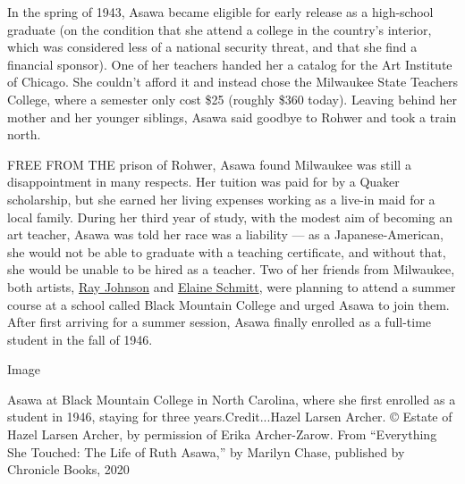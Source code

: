 In the spring of 1943, Asawa became eligible for early release as a
high-school graduate (on the condition that she attend a college in the
country's interior, which was considered less of a national security
threat, and that she find a financial sponsor). One of her teachers
handed her a catalog for the Art Institute of Chicago. She couldn't
afford it and instead chose the Milwaukee State Teachers College, where
a semester only cost \$25 (roughly \$360 today). Leaving behind her
mother and her younger siblings, Asawa said goodbye to Rohwer and took a
train north.

FREE FROM THE prison of Rohwer, Asawa found Milwaukee was still a
disappointment in many respects. Her tuition was paid for by a Quaker
scholarship, but she earned her living expenses working as a live-in
maid for a local family. During her third year of study, with the modest
aim of becoming an art teacher, Asawa was told her race was a liability
--- as a Japanese-American, she would not be able to graduate with a
teaching certificate, and without that, she would be unable to be hired
as a teacher. Two of her friends from Milwaukee, both artists,
\href{https://www.nytimes3xbfgragh.onion/2015/01/11/arts/design/ray-johnson-defies-categories-20-years-after-his-death.html}{Ray
Johnson} and
\href{http://www.blackmountaincollege.org/elaine-schmitt-urbain/}{Elaine
Schmitt}, were planning to attend a summer course at a school called
Black Mountain College and urged Asawa to join them. After first
arriving for a summer session, Asawa finally enrolled as a full-time
student in the fall of 1946.

Image

Asawa at Black Mountain College in North Carolina, where she first
enrolled as a student in 1946, staying for three years.Credit...Hazel
Larsen Archer. © Estate of Hazel Larsen Archer, by permission of Erika
Archer-Zarow. From ``Everything She Touched: The Life of Ruth Asawa,''
by Marilyn Chase, published by Chronicle Books, 2020

